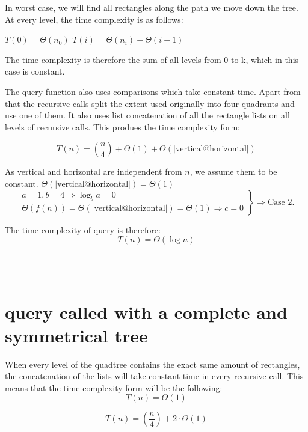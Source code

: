\documentclass[12pt, a4paper]{article}
\begin{document}
In worst case, we will find all rectangles along the path we move down the tree. At every level, the time complexity is as follows: 

$T(0)= \Theta(n_0)$
$T(i)= \Theta(n_i) + \Theta(i-1)$

The time complexity is therefore the sum of all levels from 0 to k, which in this case is constant.



The query function also uses comparisons which take constant time. Apart from that the recursive calls split the extent used originally into four quadrants and use one of them. It also uses list concatenation of all the rectangle lists on all levels of recursive calls. This produes the time complexity form:

$$T(n)=\left(\frac{n}{4}\right)+\Theta(1)+\Theta(|\text{vertical@horizontal}|)$$

As vertical and horizontal are independent from $n$, we assume them to be constant. $\Theta(|\text{vertical@horizontal}|) = \Theta(1)$\\

\[
\left.
\begin{array}{l}
  a=1, b=4 \Rightarrow \log_ba = 0 \\
  \Theta(f(n)) = \Theta(|\text{vertical@horizontal}|) = \Theta(1) \Rightarrow c = 0
\end{array} \right\} \Rightarrow \text{Case 2.}
\]

The time complexity of query is therefore: $$T(n)=\Theta(\log n)$$

\\
\\
\section{query called with a complete and symmetrical tree}

When every level of the quadtree contains the exact same amount of rectangles, the concatenation of the lists will take constant time in every recursive call. This means that the time complexity form will be the following: $$T(n)=\Theta(1)$$

 $$T(n)=\left(\frac{n}{4}\right)+2\cdot\Theta(1)$$\\
\end{document}
